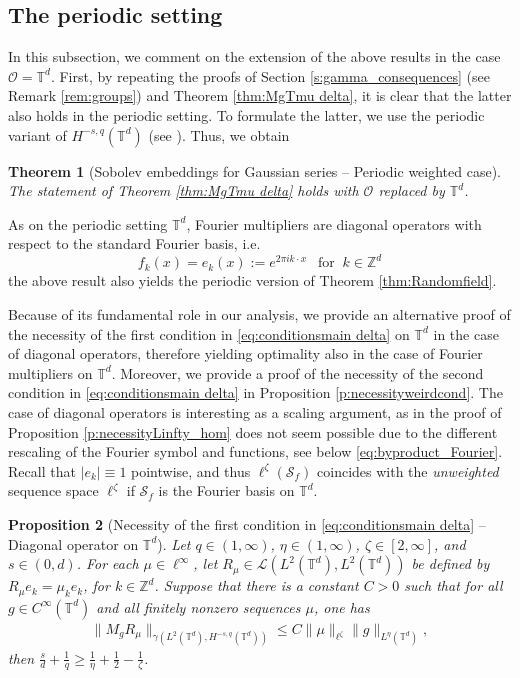 \documentclass[reqno]{amsart}
\theoremstyle{plain}
\newtheorem{theorem}{Theorem}[section]
\theoremstyle{remark}
\theoremstyle{plain}
\newtheorem{proposition}[theorem]{Proposition}
\numberwithin{equation}{section}
\newcommand\calL{\mathcal{L}}
\newcommand\cO{\mathcal{O}}
\def\Z{{\mathbb Z}}
\newcommand{\T}{\mathbb{T}}
\newcommand{\1}{\one}
\renewcommand{\S}{\mathcal{S}}
\newcommand{\Sf}{\mathcal{S}_{f}}
\begin{document}
\subsection{The periodic setting}
\label{ss:periodic_setting}
In this subsection, we comment on the extension of the above results in the case $\cO=\T^d$. 
First, by repeating the proofs of Section \ref{s:gamma_consequences} (see Remark \ref{rem:groups}) and Theorem \ref{thm:MgTmu delta}, it is clear that the latter also holds in the periodic setting. To formulate the latter, we use the periodic variant of $H^{-s,q}(\T^d)$ (see \cite[Chapter 9]{Tri83}). Thus, we obtain 

\begin{theorem}[Sobolev embeddings for Gaussian series -- Periodic weighted case]
\label{thm:MgTmu deltaTd}
The statement of Theorem \ref{thm:MgTmu delta} holds with $\mathcal{O}$ replaced by $\T^d$. 
\end{theorem}

As on the periodic setting $\T^d$, Fourier multipliers are diagonal operators with respect to the standard Fourier basis, i.e.\ $$
f_k(x)=e_k(x):=e^{2\pi i k\cdot x} \ \ \text{ for } \ k\in \Z^d
$$ 
the above result also yields the periodic version of Theorem \ref{thm:Randomfield}. 

Because of its fundamental role in our analysis, we provide an alternative proof of the necessity of the first condition in \eqref{eq:conditionsmain delta} on $\T^d$ in the case of diagonal operators, therefore yielding optimality also in the case of Fourier multipliers on $\T^d$. Moreover, we provide a proof of the necessity of the second condition in \eqref{eq:conditionsmain delta} in Proposition \ref{p:necessityweirdcond}. The case of diagonal operators is interesting as a scaling argument, as in the proof of Proposition  \ref{p:necessityLinfty_hom} does not seem possible due to the different rescaling of the Fourier symbol and functions, see below \eqref{eq:byproduct_Fourier}. 
Recall that $|e_k|\equiv 1$ pointwise, and thus $\ell^\zeta(\S_f)$ coincides with the \emph{unweighted} sequence space $\ell^\zeta$ if $\Sf$ is the Fourier basis on $\T^d$. 


\begin{proposition}[Necessity of the first condition in \eqref{eq:conditionsmain delta} -- Diagonal operator on $\T^d$]
\label{p:necessityLinfty}
Let $
q\in (1, \infty)$, $ \eta\in (1, \infty)$, $\zeta\in [2, \infty]$, and   $s\in(0,d)$. 
For each $\mu\in \ell^\infty$, let $R_{\mu}\in \calL(L^2(\T^d),L^2(\T^d))$ be defined by $R_{\mu} e_k = \mu_k e_k$, for   $k\in \Z^d$. Suppose that there is a constant $C>0$ such that for all $g\in C^\infty(\T^d)$ and all finitely nonzero sequences $\mu$, one has
\begin{align*}
\|M_g R_\mu \|_{\gamma(L^2(\T^d),H^{-s,q}(\T^d))}\leq C \|\mu\|_{\ell^{\zeta}} \|g\|_{L^{\eta}(\T^d)},
\end{align*}
then $\frac{s}{d} + \frac{1}{q}  \geq \frac{1}{\eta} + \frac{1}{2} - \frac{1}{\zeta}$.
\end{proposition}
\end{document}
